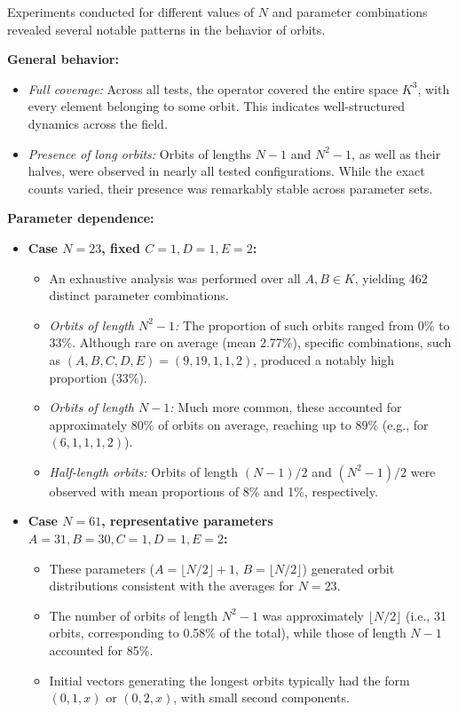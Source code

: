\documentclass[12pt]{article}
\theoremstyle{definition}
\theoremstyle{plain}
\theoremstyle{remark}
\begin{document}
Experiments conducted for different values of \( N \) and parameter combinations revealed several notable patterns in the behavior of orbits.

\textbf{General behavior:}
\begin{itemize}
    \item \textit{Full coverage:} Across all tests, the operator covered the entire space \( K^3 \), with every element belonging to some orbit. This indicates well-structured dynamics across the field.
    \item \textit{Presence of long orbits:} Orbits of lengths \( N - 1 \) and \( N^2 - 1 \), as well as their halves, were observed in nearly all tested configurations. While the exact counts varied, their presence was remarkably stable across parameter sets.
\end{itemize}

\textbf{Parameter dependence:}
\begin{itemize}
    \item \textbf{Case \( N = 23 \), fixed \( C = 1, D = 1, E = 2 \):}
    \begin{itemize}
        \item An exhaustive analysis was performed over all \( A, B \in K \), yielding 462 distinct parameter combinations.
        \item \textit{Orbits of length \( N^2 - 1 \):} The proportion of such orbits ranged from 0\% to 33\%. Although rare on average (mean 2.77\%), specific combinations, such as \( (A, B, C, D, E) = (9, 19, 1, 1, 2) \), produced a notably high proportion (33\%).
        \item \textit{Orbits of length \( N - 1 \):} Much more common, these accounted for approximately 80\% of orbits on average, reaching up to 89\% (e.g., for \( (6, 1, 1, 1, 2) \)).
        \item \textit{Half-length orbits:} Orbits of length \( (N - 1)/2 \) and \( (N^2 - 1)/2 \) were observed with mean proportions of 8\% and 1\%, respectively.
    \end{itemize}

    \item \textbf{Case \( N = 61 \), representative parameters \( A = 31, B = 30, C = 1, D = 1, E = 2 \):}
    \begin{itemize}
        \item These parameters (\( A = \lfloor N/2 \rfloor + 1 \), \( B = \lfloor N/2 \rfloor \)) generated orbit distributions consistent with the averages for \( N = 23 \).
        \item The number of orbits of length \( N^2 - 1 \) was approximately \( \lfloor N/2 \rfloor \) (i.e., 31 orbits, corresponding to 0.58\% of the total), while those of length \( N - 1 \) accounted for 85\%.
        \item Initial vectors generating the longest orbits typically had the form \( (0, 1, x) \) or \( (0, 2, x) \), with small second components.
    \end{itemize}
\end{itemize}
\end{document}
